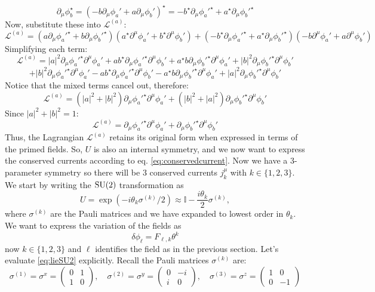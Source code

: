    \[
   \partial_\mu \phi_b^\star = (-b \partial_\mu \phi_a' + a \partial_\mu \phi_b')^\star = -b^\star \partial_\mu \phi_a'^\star + a^\star \partial_\mu \phi_b'^\star
   \]
   Now, substitute these into \(\mathcal L^{(a)}\):
   \[
   \mathcal L^{(a)} = (a \partial_\mu \phi_a'^\star + b \partial_\mu \phi_b'^\star)(a^\star \partial^\mu \phi_a' + b^\star \partial^\mu \phi_b') + (-b^\star \partial_\mu \phi_a'^\star + a^\star \partial_\mu \phi_b'^\star)(-b \partial^\mu \phi_a' + a \partial^\mu \phi_b')
   \]
   Simplifying each term:
   \[
   \mathcal L^{(a)} = |a|^2 \partial_\mu \phi_a'^\star \partial^\mu \phi_a' + a b^\star \partial_\mu \phi_a'^\star \partial^\mu \phi_b' + a^\star b \partial_\mu \phi_b'^\star \partial^\mu \phi_a' + |b|^2 \partial_\mu \phi_b'^\star \partial^\mu \phi_b'
   \]
   \[
   + |b|^2 \partial_\mu \phi_a'^\star \partial^\mu \phi_a' - a b^\star \partial_\mu \phi_a'^\star \partial^\mu \phi_b' - a^\star b \partial_\mu \phi_b'^\star \partial^\mu \phi_a' + |a|^2 \partial_\mu \phi_b'^\star \partial^\mu \phi_b'
   \]
   Notice that the mixed terms cancel out, therefore:
   \[
   \mathcal L^{(a)} = (|a|^2 + |b|^2) \partial_\mu \phi_a'^\star \partial^\mu \phi_a' + (|b|^2 + |a|^2) \partial_\mu \phi_b'^\star \partial^\mu \phi_b' 
   \]
   Since \(|a|^2 + |b|^2 = 1\):
   \[
   \mathcal L^{(a)} = \partial_\mu \phi_a'^\star \partial^\mu \phi_a' + \partial_\mu \phi_b'^\star \partial^\mu \phi_b'
   \]
Thus, the Lagrangian \( \mathcal L^{(a)} \) retains its original form when expressed in terms of the primed fields.
So, $U$ is also an internal symmetry, and we now want to express the conserved currents according to eq. \eqref{eq:conservedcurrent}. Now we have a 3-parameter symmetry so there will be 3 conserved currents $j^\mu_k$ with $k\in\{1,2,3\}$. 
We start by writing the ${\rm SU}(2)$ transformation as 
\begin{equation}
    U=\exp (-i \theta_k \sigma^{(k)}/2) \approx  \mathbb I - \frac{i\theta_k }{2}\sigma^{(k)}, \label{eq:lieSU2}
\end{equation}
where $\sigma^{(k)}$ are the Pauli matrices and we have expanded to lowest order in $\theta_k$. 
We want to express the variation of the fields as
\begin{equation}
\delta \phi_\ell = F_{\ell,k} \theta^k\label{eq:defF}
\end{equation}
now $k\in\{1,2,3\}$ and $\ell$ identifies the field as in the previous section. 
Let's evaluate \eqref{eq:lieSU2} explicitly. Recall the Pauli matrices \(\sigma^{(k)}\) are:
   \[
   \sigma^{(1)} = \sigma^x = \begin{pmatrix} 0 & 1 \\ 1 & 0 \end{pmatrix}, \quad \sigma^{(2)} = \sigma^y = \begin{pmatrix} 0 & -i \\ i & 0 \end{pmatrix}, \quad \sigma^{(3)} = \sigma^z = \begin{pmatrix} 1 & 0 \\ 0 & -1 \end{pmatrix}
   \]

